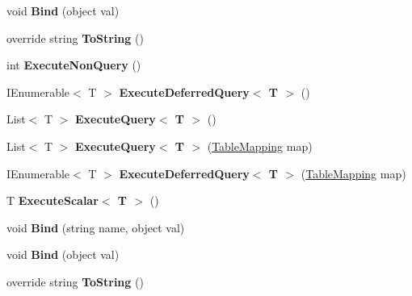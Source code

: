\begin{DoxyCompactItemize}
\item 
\hypertarget{classSQLite_1_1SQLiteCommand_afd03d0602268aef6f9300d60f6102265}{void {\bfseries Bind} (object val)}\label{classSQLite_1_1SQLiteCommand_afd03d0602268aef6f9300d60f6102265}

\item 
\hypertarget{classSQLite_1_1SQLiteCommand_a6d1c61aa253c05e163506aec881bfb49}{override string {\bfseries To\-String} ()}\label{classSQLite_1_1SQLiteCommand_a6d1c61aa253c05e163506aec881bfb49}

\item 
\hypertarget{classSQLite_1_1SQLiteCommand_a7a2b9afd67f691520b73bfb0efb18b9b}{int {\bfseries Execute\-Non\-Query} ()}\label{classSQLite_1_1SQLiteCommand_a7a2b9afd67f691520b73bfb0efb18b9b}

\item 
\hypertarget{classSQLite_1_1SQLiteCommand_a28f64ff5f495468d9f480bd5d1b4338d}{I\-Enumerable$<$ T $>$ {\bfseries Execute\-Deferred\-Query$<$ T $>$} ()}\label{classSQLite_1_1SQLiteCommand_a28f64ff5f495468d9f480bd5d1b4338d}

\item 
\hypertarget{classSQLite_1_1SQLiteCommand_a6aa1993738e35a863eea4c5d7cee212e}{List$<$ T $>$ {\bfseries Execute\-Query$<$ T $>$} ()}\label{classSQLite_1_1SQLiteCommand_a6aa1993738e35a863eea4c5d7cee212e}

\item 
\hypertarget{classSQLite_1_1SQLiteCommand_a89a1919e9f583731eaabaf12e1982e39}{List$<$ T $>$ {\bfseries Execute\-Query$<$ T $>$} (\hyperlink{classSQLite_1_1TableMapping}{Table\-Mapping} map)}\label{classSQLite_1_1SQLiteCommand_a89a1919e9f583731eaabaf12e1982e39}

\item 
\hypertarget{classSQLite_1_1SQLiteCommand_a092913169afcc6c9fdd9ae5e5ca7cf96}{I\-Enumerable$<$ T $>$ {\bfseries Execute\-Deferred\-Query$<$ T $>$} (\hyperlink{classSQLite_1_1TableMapping}{Table\-Mapping} map)}\label{classSQLite_1_1SQLiteCommand_a092913169afcc6c9fdd9ae5e5ca7cf96}

\item 
\hypertarget{classSQLite_1_1SQLiteCommand_a3ce415ca55779eaf3d1851060eff05cc}{T {\bfseries Execute\-Scalar$<$ T $>$} ()}\label{classSQLite_1_1SQLiteCommand_a3ce415ca55779eaf3d1851060eff05cc}

\item 
\hypertarget{classSQLite_1_1SQLiteCommand_adc2e4047e52cc3da0307a74e74e276f7}{void {\bfseries Bind} (string name, object val)}\label{classSQLite_1_1SQLiteCommand_adc2e4047e52cc3da0307a74e74e276f7}

\item 
\hypertarget{classSQLite_1_1SQLiteCommand_afd03d0602268aef6f9300d60f6102265}{void {\bfseries Bind} (object val)}\label{classSQLite_1_1SQLiteCommand_afd03d0602268aef6f9300d60f6102265}

\item 
\hypertarget{classSQLite_1_1SQLiteCommand_a6d1c61aa253c05e163506aec881bfb49}{override string {\bfseries To\-String} ()}\label{classSQLite_1_1SQLiteCommand_a6d1c61aa253c05e163506aec881bfb49}

\end{DoxyCompactItemize}
